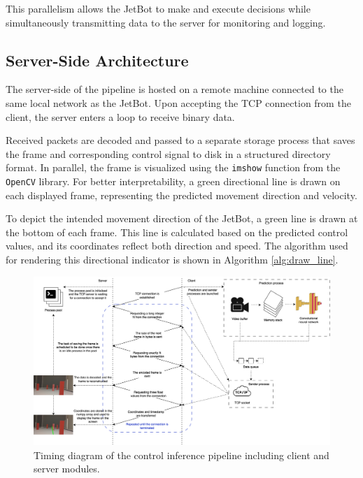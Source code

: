 This parallelism allows the JetBot to make and execute decisions while simultaneously transmitting data to the server for monitoring and logging.

\subsection{Server-Side Architecture}

The server-side of the pipeline is hosted on a remote machine connected to the same local network as the JetBot. Upon accepting the TCP connection from the client, the server enters a loop to receive binary data.

Received packets are decoded and passed to a separate storage process that saves the frame and corresponding control signal to disk in a structured directory format. In parallel, the frame is visualized using the \texttt{imshow} function from the \texttt{OpenCV} library. For better interpretability, a green directional line is drawn on each displayed frame, representing the predicted movement direction and velocity.

To depict the intended movement direction of the JetBot, a green line is drawn at the bottom of each frame. This line is calculated based on the predicted control values, and its coordinates reflect both direction and speed. The algorithm used for rendering this directional indicator is shown in Algorithm \ref{alg:draw_line}.

\begin{figure}[H]
  \centering
  \includegraphics[width=1.0\linewidth]{Images/control_inference_pipeline.png}
  \caption{Timing diagram of the control inference pipeline including client and server modules.}
  \label{fig:pipeline}
\end{figure}

